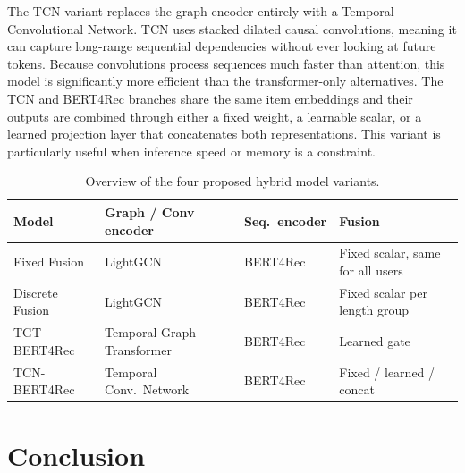 \documentclass[12pt,a4paper]{report}
\begin{document}
The TCN variant replaces the graph encoder entirely with a Temporal
Convolutional Network. TCN uses stacked dilated causal convolutions, meaning
it can capture long-range sequential dependencies without ever looking at
future tokens. Because convolutions process sequences much faster than
attention, this model is significantly more efficient than the transformer-only
alternatives. The TCN and BERT4Rec branches share the same item embeddings
and their outputs are combined through either a fixed weight, a learnable
scalar, or a learned projection layer that concatenates both representations.
This variant is particularly useful when inference speed or memory is a
constraint.

\begin{table}[h]
\centering
\caption{Overview of the four proposed hybrid model variants.}
\label{tab:model_family}
\begin{tabular}{p{3.8cm} p{3.2cm} p{2.8cm} p{3.0cm}}
\toprule
\textbf{Model} & \textbf{Graph / Conv encoder} & \textbf{Seq.\ encoder} & \textbf{Fusion} \\
\midrule
Fixed Fusion       & LightGCN   & BERT4Rec & Fixed scalar, same for all users \\[3pt]
Discrete Fusion    & LightGCN   & BERT4Rec & Fixed scalar per length group \\[3pt]
TGT-BERT4Rec       & Temporal Graph Transformer & BERT4Rec & Learned gate \\[3pt]
TCN-BERT4Rec       & Temporal Conv.\ Network & BERT4Rec & Fixed / learned / concat \\
\bottomrule
\end{tabular}
\end{table}

\section{Conclusion}
\label{sec:ch2conclusion}
\end{document}
